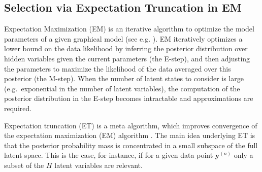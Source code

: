 \documentclass[12pt]{article}
\renewcommand{\vec}[1]{{\mathbf{#1}}}
\begin{document}
\subsection{Selection via Expectation Truncation in EM}
Expectation Maximization (EM) is an iterative algorithm to optimize the model parameters of a given graphical model (see e.g. \citep{DempsterEtAl1977, NealHinton1998}).
EM iteratively optimizes a lower bound on the data likelihood by inferring the
posterior distribution over hidden variables given the current parameters (the
E-step), and then adjusting the parameters to maximize the likelihood of the
data averaged over this posterior (the M-step).
%
When the number of latent states to consider is large (e.g.\ exponential in the
number of latent variables), the computation of the posterior distribution in
the E-step becomes intractable and approximations are required.


Expectation truncation (ET) is a meta algorithm, which improves convergence of the expectation maximization (EM) algorithm \citep{LuckeEggert2010}.
%
The main idea underlying ET is that the posterior probability mass is concentrated in a small subspace of the full latent space.
This is the case, for instance, if for a given data point $\vec{y}^{(n)}$ 
only a subset of the $H$ latent variables  are relevant. 
\end{document}
